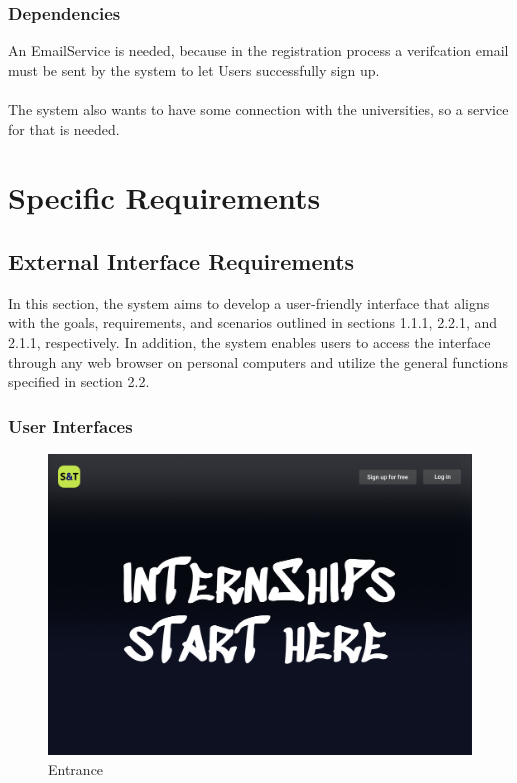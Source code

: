 \documentclass{article}
\begin{document}
\subsubsection{Dependencies}
An EmailService is needed, because in the registration process a verifcation email must be sent by the system to let Users successfully sign up.\\ \\The system also wants to have some connection with the universities, so a service for that is needed.

\section{Specific Requirements}
\subsection{External Interface Requirements}
In this section, the system aims to develop a user-friendly interface that aligns with the goals, requirements, and scenarios outlined in sections 1.1.1, 2.2.1, and 2.1.1, respectively. In addition, the system enables users to access the interface through any web browser on personal computers and utilize the general functions specified in section 2.2.
\subsubsection{User Interfaces}
\begin{figure}[H]
    \centering
    \includegraphics[scale = 0.35]{figures/UserInterfaces/General/Entrance.png}
    \caption{Entrance}
    \centering
\end{figure}
\end{document}

